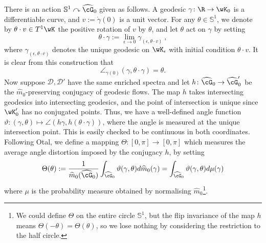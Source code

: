 \documentclass[reqno,11pt]{amsart}
\begin{document}
    
    \par There is an action \(\mathbb{S}^1 \curvearrowright \widehat{\cG}_0\) given as follows.
    A geodesic \(\gamma\colon \R \to \wK_0\) is a differentiable curve, and \(v := \dot\gamma(0)\) is a unit vector. 
    For any \(\theta \in \mathbb{S}^1\), we denote by \(\theta\cdot v \in T^1\wK \) the positive rotation of \(v\) by \(\theta\), and let \(\theta\) act on \(\gamma\) by setting
    \[
        \theta\cdot\gamma := \lim_{\epsilon \to 0}\gamma_{(\epsilon, \theta\cdot v)} \ ,
    \]
    where \(\gamma_{(\epsilon, \theta\cdot v)}\) denotes the unique geodesic on \(\wK_\epsilon\) with initial condition \(\theta\cdot v\).
    It is clear from this construction that 
    \[
        \angle_{\gamma(0)}(\gamma, \theta\cdot\gamma) = \theta.
    \]
    Now suppose \(\mathcal{D}, \mathcal{D}'\) have the same enriched spectra and let \(h\colon\widehat{\cG}_0 \to \widehat{\cG}_0'\) be the \(\widehat{m}_0\)-preserving conjugacy of geodesic flows. The map
    \(h\) takes intersecting geodesics into intersecting geodesics, and the point of intersection is unique since \(\wK_0'\) has no conjugated points.
    Thus, we have a well-defined angle function \(\vartheta\colon (\gamma,\theta) \mapsto \angle(h\gamma, h(\theta\cdot\gamma))\), where the angle is measured at the unique intersection point.  
    This is easily checked to be continuous in both coordinates.
    Following Otal, we define a mapping \(\Theta\colon [0, \pi] \to [0, \pi]\) which measures the average angle distortion imposed by the conjugacy \(h\), by setting
    \[
        \Theta(\theta) := \frac{1}{\widehat{m}_0(\widehat{\cG}_0)}\int_{\widehat{\cG}_0}\vartheta(\gamma, \theta) d\widehat{m}_0(\gamma) = \int_{\widehat{\cG}_0}\vartheta(\gamma, \theta) d\mu(\gamma)
    \]
    where \(\mu\) is the probability measure obtained by normalising \(\widehat{m}_0\)\footnote{
        We could define \(\Theta\) on the entire circle \(\mathbb{S}^1\), but the flip invariance of the map \(h\) means \(\Theta(-\theta) = \Theta(\theta)\), so we lose nothing by considering the restriction to the half circle.
    }.
\end{document}
